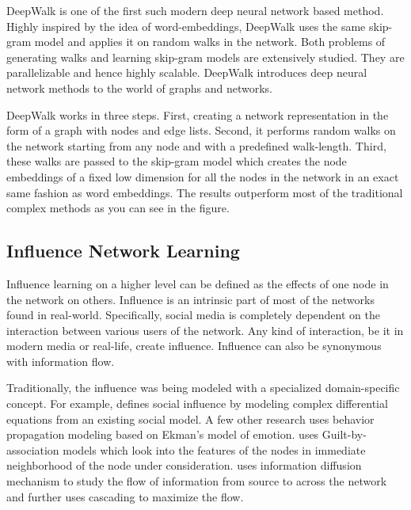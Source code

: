 DeepWalk \cite{perozzi2014deepwalk} is one of the first such modern deep neural network based method. Highly inspired by the idea of word-embeddings, DeepWalk \cite{perozzi2014deepwalk} uses the same skip-gram model and applies it on random walks in the network. Both problems of generating walks and learning skip-gram models are extensively studied. They are parallelizable and hence highly scalable. DeepWalk \cite{perozzi2014deepwalk} introduces deep neural network methods to the world of graphs and networks.

DeepWalk \cite{perozzi2014deepwalk} works in three steps. First, creating a network representation in the form of a graph with nodes and edge lists. Second, it performs random walks on the network starting from any node and with a predefined walk-length. Third, these walks are passed to the skip-gram model which creates the node embeddings of a fixed low dimension for all the nodes in the network in an exact same fashion as word embeddings. The results outperform most of the traditional complex methods as you can see in the figure.



\subsection{Influence Network Learning}
Influence learning on a higher level can be defined as the effects of one node in the network on others. Influence is an intrinsic part of most of the networks found in real-world. Specifically, social media is completely dependent on the interaction between various users of the network. Any kind of interaction, be it in modern media or real-life, create influence. Influence can also be synonymous with information flow.

Traditionally, the influence was being modeled with a specialized domain-specific concept. For example, \cite{matsubara2012rise} defines social influence by modeling complex differential equations from an existing social model. A few other research uses behavior propagation modeling based on Ekman's model of emotion. \cite{wang2017gang} uses Guilt-by-association models which look into the features of the nodes in immediate neighborhood of the node under consideration. \cite{kempe2003maximizing} uses information diffusion mechanism to study the flow of information from source to across the network and further uses cascading to maximize the flow.

